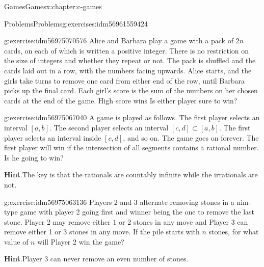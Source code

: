 \documentclass[twoside,10pt,]{book}
\newcommand{\blocktitlefont}{\relax}
\numberwithin{equation}{section}
\begin{document}
\begin{chapterptx}{Games}{}{Games}{}{}{x:chapter:c-games}
\begin{exercises-section}{Problems}{}{Problems}{}{}{g:exercises:idm56961559424}
\begin{divisionexercise}{8}{}{}{g:exercise:idm56975070576}
Alice and Barbara play a game with a pack of \(2n\) cards, on each of which is written a positive integer. There is no restriction on the size of integers and whether they repeat or not.   The pack is shuffled and the cards laid out in a row, with the numbers facing upwards. Alice starts, and the girls take turns to remove one card from either end of the row, until Barbara picks up the final card. Each girl's score is the sum of the numbers on her chosen cards at the end of the game. High score wins  Is either player sure to win?%
\end{divisionexercise}%
\begin{divisionexercise}{9}{}{}{g:exercise:idm56975067040}%
A game is played as follows. The first player selects an interval \([a, b]\). The second player selects an interval \([c, d] \subset  [a, b]\). The first player selects an interval inside \([c, d]\), and so on. The game goes on forever. The first player will win if the intersection of all segments contains a rational number. Is he going to win?%
\par\smallskip%
\noindent\textbf{\blocktitlefont Hint}.\hypertarget{g:hint:idm56975064768}{}\quad{}The key is that the rationals are countably infinite while the irrationals are not.%
\end{divisionexercise}%
\begin{divisionexercise}{10}{}{}{g:exercise:idm56975063136}%
Players 2 and 3 alternate removing stones in a nim-type game with player 2 going first and winner being the one to remove the last stone. Player 2 may remove either 1 or 2 stones in any move and Player 3 can remove either 1 or 3 stones in any move.  If the pile starts with \(n\) stones, for what value of \(n\) will Player 2 win the game?%
\par\smallskip%
\noindent\textbf{\blocktitlefont Hint}.\hypertarget{g:hint:idm56975061120}{}\quad{}Player 3 can never remove an even number of stones.%
\end{divisionexercise}%
\end{exercises-section}
\end{chapterptx}
%
%
\typeout{************************************************}
\typeout{************************************************}
%
\end{document}
